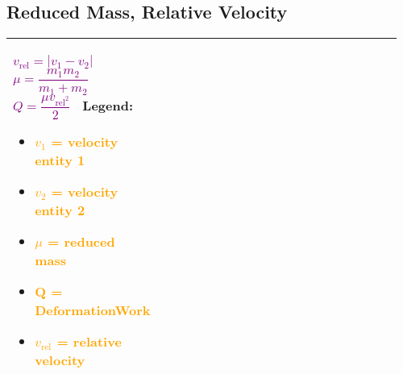 \documentclass[main.tex,fontsize=8pt,paper=a4,paper=portrait,DIV=calc,]{scrartcl}
\begin{document}
\begin{table}[ht!]
\subsection{Reduced Mass, Relative Velocity}
\begin{tabular}{|m{0.2\linewidth}|m{0.755\linewidth}|}
\hline
\vspace{2mm}
\Huge \textcolor{purple}{\(v_{\text{rel}} = | v_1 - v_2|\)}\newline
\textcolor{purple}{\(\mu = \dfrac{m_1m_2}{m_1 + m_2}\)}\newline
\textcolor{purple}{\( Q = \dfrac{\mu v_{\text{rel}^2}}{2}\)}\newline
\normalsize \, \newline
Legend:\newline
\begin{itemize}
\item \textcolor{orange}{\(v_1\) = velocity entity 1}
\item \textcolor{orange}{\(v_2\) = velocity entity 2}
\item \textcolor{orange}{\(\mu\) = reduced mass}
\item \textcolor{orange}{Q = DeformationWork}
\item \textcolor{orange}{\(v_{\text{rel}}\) = relative velocity}
\vspace{-3mm}
\end{itemize} \\
\hline

\hline

\hline

\hline

\hline

\hline

\hline

\hline

\hline

\hline

\hline

\hline
\end{tabular}
\end{table}
\end{document}

